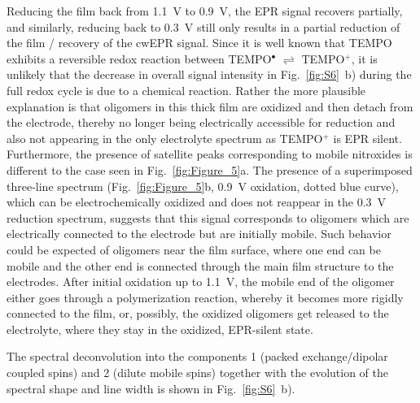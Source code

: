 \par
Reducing the film back from 1.1~V to 0.9~V, the EPR signal recovers partially, and similarly, reducing back to 0.3~V still only results in a partial reduction of the film / recovery of the cwEPR signal. Since it is well known that TEMPO exhibits a reversible redox reaction between TEMPO$^{\bullet}$ $\rightleftharpoons$ TEMPO$^{+}$, it is unlikely that the decrease in overall signal intensity in Fig.~\ref{fig:S6}~b) during the full redox cycle is due to a chemical reaction. Rather the more plausible explanation is that oligomers in this thick film are oxidized and then detach from the electrode, thereby no longer being electrically accessible for reduction and also not appearing in the only electrolyte spectrum as TEMPO$^{+}$ is EPR silent. Furthermore, the presence of satellite peaks corresponding to mobile nitroxides is different to the case seen in Fig.~\ref{fig:Figure_5}a. The presence of a superimposed three-line spectrum (Fig.~\ref{fig:Figure_5}b, 0.9~V oxidation, dotted blue curve), which can be electrochemically oxidized and does not reappear in the 0.3~V reduction spectrum, suggests that this signal corresponds to oligomers which are electrically connected to the electrode but are initially mobile. Such behavior could be expected of oligomers near the film surface, where one end can be mobile and the other end is connected through the main film structure to the electrodes. After initial oxidation up to 1.1~V, the mobile end of the oligomer either goes through a polymerization reaction, whereby it becomes more rigidly connected to the film, or, possibly, the oxidized oligomers get released to the electrolyte, where they stay in the oxidized, EPR-silent state.

\par
The spectral deconvolution into the components 1 (packed exchange/dipolar coupled spins) and 2 (dilute mobile spins) together with the evolution of the spectral shape and line width is shown in Fig.~\ref{fig:S6}~b).

